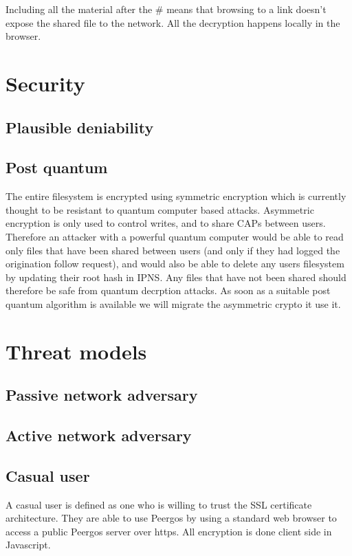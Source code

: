 \documentclass[12pt]{article}
\begin{document}
Including all the material after the \# means that browsing to a link doesn't expose the shared file to the network. All the decryption happens locally in the browser. 

\section*{Security}
\subsection*{Plausible deniability}

\subsection*{Post quantum}
The entire filesystem is encrypted using symmetric encryption which is currently thought to be resistant to quantum computer based attacks. Asymmetric encryption is only used to control writes, and to share CAPs between users. Therefore an attacker with a powerful quantum computer would be able to read only files that have been shared between users (and only if they had logged the origination follow request), and would also be able to delete any users filesystem by updating their root hash in IPNS. Any files that have not been shared should therefore be safe from quantum decrption attacks. As soon as a suitable post quantum algorithm is available we will migrate the asymmetric crypto it use it. 

\section*{Threat models}

\subsection*{Passive network adversary}
\subsection*{Active network adversary}
\subsection*{Casual user}
A casual user is defined as one who is willing to trust the SSL certificate architecture. They are able to use Peergos by using a standard web browser to access a public Peergos server over https. All encryption is done client side in Javascript.
\end{document}
